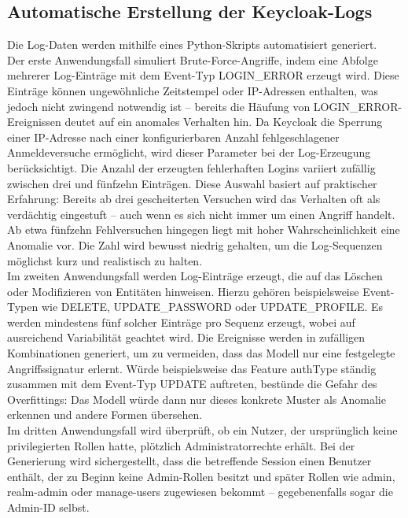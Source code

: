 \documentclass[a4paper,12pt]{article}
\begin{document}
	\subsection{Automatische Erstellung der Keycloak-Logs}
	Die Log-Daten werden mithilfe eines Python-Skripts automatisiert generiert.
	\\[0.5em]
	Der erste Anwendungsfall simuliert Brute-Force-Angriffe, indem eine Abfolge mehrerer Log-Einträge mit dem Event-Typ LOGIN\_ERROR erzeugt wird. Diese Einträge können ungewöhnliche Zeitstempel oder IP-Adressen enthalten, was jedoch nicht zwingend notwendig ist – bereits die Häufung von LOGIN\_ERROR-Ereignissen deutet auf ein anomales Verhalten hin. Da Keycloak die Sperrung einer IP-Adresse nach einer konfigurierbaren Anzahl fehlgeschlagener Anmeldeversuche ermöglicht, wird dieser Parameter bei der Log-Erzeugung berücksichtigt. Die Anzahl der erzeugten fehlerhaften Logins variiert zufällig zwischen drei und fünfzehn Einträgen. Diese Auswahl basiert auf praktischer Erfahrung: Bereits ab drei gescheiterten Versuchen wird das Verhalten oft als verdächtig eingestuft – auch wenn es sich nicht immer um einen Angriff handelt. Ab etwa fünfzehn Fehlversuchen hingegen liegt mit hoher Wahrscheinlichkeit eine Anomalie vor. Die Zahl wird bewusst niedrig gehalten, um die Log-Sequenzen möglichst kurz und realistisch zu halten.
	\\[0.5em]
	Im zweiten Anwendungsfall werden Log-Einträge erzeugt, die auf das Löschen oder Modifizieren von Entitäten hinweisen. Hierzu gehören beispielsweise Event-Typen wie DELETE, UPDATE\_PASSWORD oder UPDATE\_PROFILE. Es werden mindestens fünf solcher Einträge pro Sequenz erzeugt, wobei auf ausreichend Variabilität geachtet wird. Die Ereignisse werden in zufälligen Kombinationen generiert, um zu vermeiden, dass das Modell nur eine festgelegte Angriffssignatur erlernt. Würde beispielsweise das Feature authType ständig zusammen mit dem Event-Typ UPDATE auftreten, bestünde die Gefahr des Overfittings: Das Modell würde dann nur dieses konkrete Muster als Anomalie erkennen und andere Formen übersehen.
	\\[0.5em]
	Im dritten Anwendungsfall wird überprüft, ob ein Nutzer, der ursprünglich keine privilegierten Rollen hatte, plötzlich Administratorrechte erhält. Bei der Generierung wird sichergestellt, dass die betreffende Session einen Benutzer enthält, der zu Beginn keine Admin-Rollen besitzt und später Rollen wie admin, realm-admin oder manage-users zugewiesen bekommt – gegebenenfalls sogar die Admin-ID selbst.
	\\[0.5em]
\end{document}
